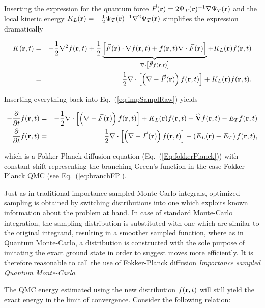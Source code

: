 Inserting the expression for the quantum force $\vec F(\mathbf{r}) = 2\Psi_T(\mathbf{r})^{-1}\nabla\Psi_T(\mathbf{r})$ and the local kinetic energy $K_L(\mathbf{r}) = -\frac{1}{2}\Psi_T(\mathbf{r})^{-1}\nabla^2\Psi_T(\mathbf{r})$ simplifies the expression dramatically

\begin{eqnarray*}
 K(\mathbf{r}, t) &=& - \frac{1}{2}\nabla^2 f(\mathbf{r}, t) + \frac{1}{2}\underbrace{\left[\vec F(\mathbf{r})\cdot \nabla f(\mathbf{r}, t) + f(\mathbf{r}, t)\nabla\cdot \vec F(\mathbf{r})\right]}_{\nabla\cdot\left[\vec F f(\mathbf{r}, t)\right]} + K_L(\mathbf{r})f(\mathbf{r}, t)\\
         &=& \frac{1}{2}\nabla\cdot \left[\left(\nabla - \vec F(\mathbf{r})\right)f(\mathbf{r}, t)\right] + K_L(\mathbf{r})f(\mathbf{r}, t).
\end{eqnarray*}

Inserting everything back into Eq.~(\ref{eq:impSamplRaw}) yields

\begin{eqnarray}
 -\frac{\partial}{\partial t}f(\mathbf{r}, t) &=& -\frac{1}{2}\nabla\cdot \left[\left(\nabla - \vec F(\mathbf{r})\right)f(\mathbf{r}, t)\right] + K_L(\mathbf{r})f(\mathbf{r}, t) + {\bf\widehat{V}}f(\mathbf{r}, t) - E_Tf(\mathbf{r},t) \nonumber\\
  \frac{\partial}{\partial t}f(\mathbf{r}, t)  &=& \frac{1}{2}\nabla\cdot \left[\left(\nabla - \vec F(\mathbf{r})\right)f(\mathbf{r}, t)\right] - \left(E_L(\mathbf{r}) - E_T\right)f(\mathbf{r}, t), 
\end{eqnarray}

which is a Fokker-Planck diffusion equation (Eq.~(\ref{Eq:fokkerPlanck})) with constant shift representing the branching Green's function in the case Fokker-Planck QMC (see Eq.~(\ref{eq:branchFP}).

Just as in traditional importance sampled Monte-Carlo integrals, optimized sampling is obtained by switching distributions into one which exploits known information about the problem at hand. In case of standard Monte-Carlo integration, the sampling distribution is substituted with one which are similar to the original integrand, resulting in a smoother sampled function, where as in Quantum Monte-Carlo, a distribution is constructed with the sole purpose of imitating the exact ground state in order to suggest moves more efficiently. It is therefore reasonable to call the use of Fokker-Planck diffusion \textit{Importance sampled Quantum Monte-Carlo}.

The QMC energy estimated using the new distribution $f(\mathbf{r}, t)$ will still yield the exact energy in the limit of convergence. Consider the following relation:

